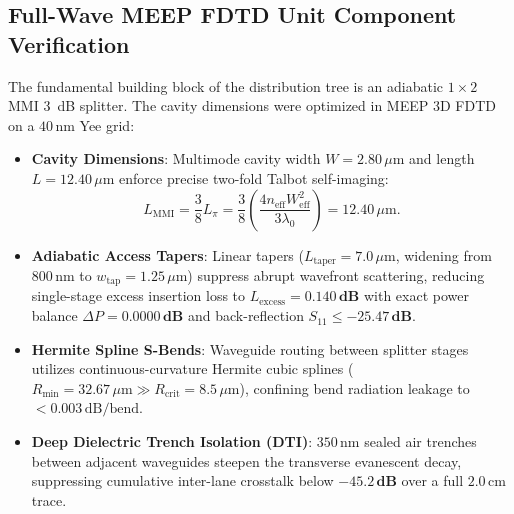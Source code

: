 \documentclass[journal]{IEEEtran}
\begin{document}
\subsection{Full-Wave MEEP FDTD Unit Component Verification}
The fundamental building block of the distribution tree is an adiabatic $1 \times 2$ MMI 3~dB splitter. The cavity dimensions were optimized in MEEP 3D FDTD on a $40\,\text{nm}$ Yee grid:
\begin{itemize}
    \item \textbf{Cavity Dimensions}: Multimode cavity width $W = 2.80\,\mu\text{m}$ and length $L = 12.40\,\mu\text{m}$ enforce precise two-fold Talbot self-imaging:
    \begin{equation}
        L_{\text{MMI}} = \frac{3}{8} L_\pi = \frac{3}{8}\left(\frac{4 n_{\text{eff}} W_{\text{eff}}^2}{3\lambda_0}\right) = 12.40\,\mu\text{m}.
    \end{equation}
    \item \textbf{Adiabatic Access Tapers}: Linear tapers ($L_{\text{taper}} = 7.0\,\mu\text{m}$, widening from $800\,\text{nm}$ to $w_{\text{tap}} = 1.25\,\mu\text{m}$) suppress abrupt wavefront scattering, reducing single-stage excess insertion loss to $L_{\text{excess}} = \mathbf{0.140\,\text{dB}}$ with exact power balance $\Delta P = \mathbf{0.0000\,\text{dB}}$ and back-reflection $S_{11} \le \mathbf{-25.47\,\text{dB}}$.
    \item \textbf{Hermite Spline S-Bends}: Waveguide routing between splitter stages utilizes continuous-curvature Hermite cubic splines ($R_{\min} = 32.67\,\mu\text{m} \gg R_{\text{crit}} = 8.5\,\mu\text{m}$), confining bend radiation leakage to $<0.003\,\text{dB/bend}$.
    \item \textbf{Deep Dielectric Trench Isolation (DTI)}: $350\,\text{nm}$ sealed air trenches between adjacent waveguides steepen the transverse evanescent decay, suppressing cumulative inter-lane crosstalk below $\mathbf{-45.2\,\text{dB}}$ over a full $2.0\,\text{cm}$ trace.
\end{itemize}
\end{document}
